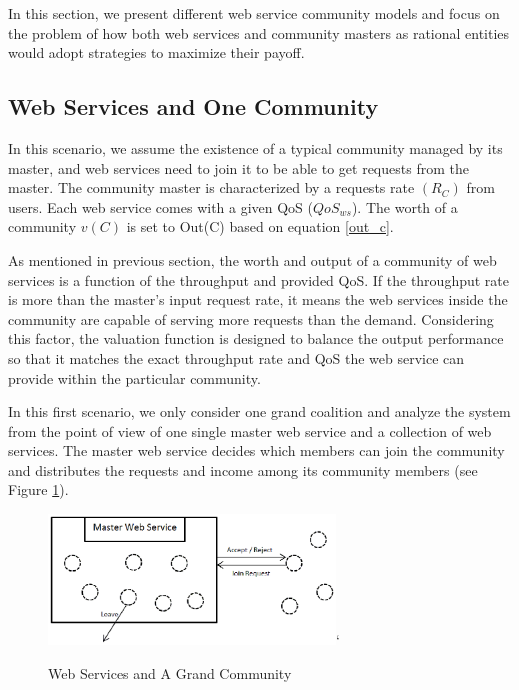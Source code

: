 In this section, we present different web service community models
and focus on the problem of how both web services and community
masters as rational entities would adopt strategies to maximize
their payoff.

\subsection {Web Services and One Community}

In this scenario, we assume the existence of a typical community
managed by its master, and web services need to join it to be able
to get requests from the master. The community master is
characterized by a requests rate $(R_{C})$ from users. Each web
service comes with a given QoS ($QoS_{ws}$). The worth of a community
$v(C)$ is set to Out(C) based on equation \ref{out_c}.

As mentioned in previous section, the worth and output of a
community of web services is a function of the
throughput and provided QoS. If the throughput rate is more than
the master's input request rate, it means the web services inside
the community are capable of serving more requests than the
demand. Considering this factor, the valuation function is
designed to balance the output performance so that it matches the
exact throughput rate and QoS the web service can provide within
the particular community.

In this first scenario, we only consider one grand coalition and
analyze the system from the point of view of one single master web
service and a collection of web services. The master web service
decides which members can join
the community and distributes the requests and income among its
community members (see Figure \ref{fig_sim1}).

\begin{figure}[!t]
\centering
\includegraphics[width=3in]{Figures/s1.eps}`
\caption{Web Services and A Grand Community}
\label{fig_sim1}
\end{figure}

